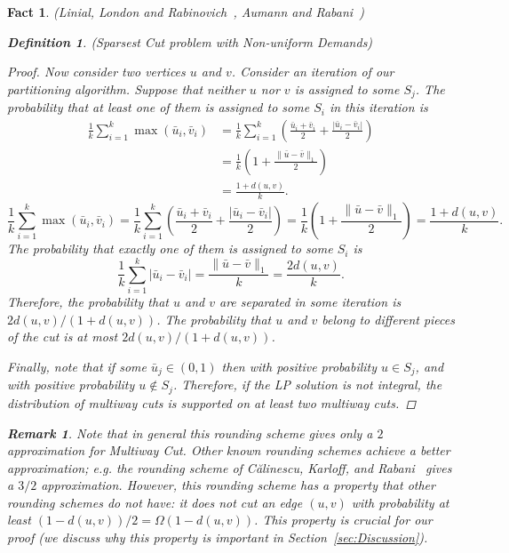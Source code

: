 \documentclass[twoside,leqno,twocolumn]{article}
\newtheorem{Definition}[theorem]{Definition}
\newtheorem{fact}[theorem]{Fact}
\newtheorem{remark}{Remark}[section]
\begin{document}
\begin{fact}{\sc (Linial, London and Rabinovich~\cite{LLR}, Aumann and Rabani~\cite{AR})}
\begin{Definition} {\sc (Sparsest Cut problem with Non-uniform Demands)}
\begin{proof}
Now consider two vertices $u$ and $v$. Consider an iteration of our partitioning algorithm. Suppose that neither $u$ nor $v$ is assigned
to some $S_j$. The probability that at least one of them is assigned to some $S_i$ in this iteration is
\ifSODA
\begin{align*}
\frac{1}{k}\sum_{i=1}^k \max(\bar u_i,\bar v_i) &= \frac{1}{k}\sum_{i=1}^k \left(\frac{\bar u_i +\bar v_i}{2} 
+ \frac{|\bar u_i -\bar v_i|}{2}\right) \\
&= \frac{1}{k}\left(1 
+ \frac{\|\bar u -\bar v\|_1}{2}\right) \\
&= \frac{1 
+ d(u,v)}{k}.
\end{align*}
\else
$$\frac{1}{k}\sum_{i=1}^k \max(\bar u_i,\bar v_i) = \frac{1}{k}\sum_{i=1}^k \left(\frac{\bar u_i +\bar v_i}{2} 
+ \frac{|\bar u_i -\bar v_i|}{2}\right) = \frac{1}{k}\left(1 
+ \frac{\|\bar u -\bar v\|_1}{2}\right) = \frac{1 
+ d(u,v)}{k}.$$
\fi
The probability that exactly one of them is assigned to some $S_i$ is
$$\frac{1}{k}\sum_{i=1}^k |\bar u_i-\bar v_i| = \frac{\|\bar u - \bar v\|_1 }{k}= \frac{2d(u,v)}{k}.$$
Therefore, the probability that $u$ and $v$ are separated in some iteration is $2d(u,v) / (1 + d(u,v))$.
The probability that $u$ and $v$ belong to different pieces of the cut is at most $2d(u,v) / (1 + d(u,v))$.

Finally, note that if some $\bar u_j \in (0,1)$ then with positive probability $u\in S_j$,
and with positive probability $u\notin S_j$. Therefore, if the LP solution is not integral, the distribution of multiway cuts is supported on at least two multiway cuts.
\end{proof}
\begin{remark}
Note that in general this rounding scheme gives only a $2$ approximation for Multiway Cut. 
Other known rounding schemes achieve a better approximation; e.g.
the rounding scheme of C\u{a}linescu, Karloff, and Rabani~\cite{CKR} gives a $3/2$ approximation.
However, this rounding scheme has a property that other rounding schemes do not have: it does not cut an edge $(u,v)$ 
with probability at least $(1 - d(u,v))/{2} = \Omega(1 - d(u,v))$. This property is crucial for our proof (we discuss why this property is important
in Section~\ref{sec:Discussion}).
\end{remark}


\end{Definition}
\end{fact}
\end{document}
